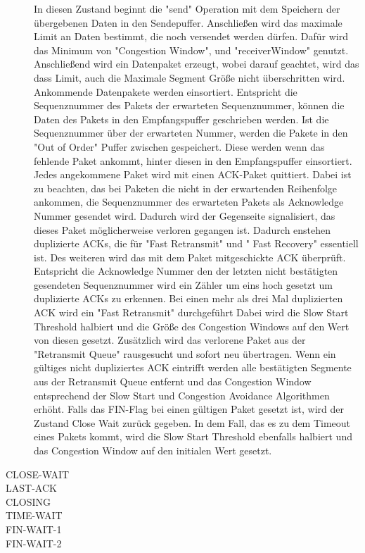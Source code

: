 \begin{description}
In diesen Zustand beginnt die {}"send"{} Operation mit dem Speichern der übergebenen Daten in den Sendepuffer. Anschließen wird das maximale Limit an Daten bestimmt, die noch versendet werden dürfen. Dafür wird das Minimum von "Congestion Window", und "receiverWindow"{} genutzt. Anschließend wird ein Datenpaket erzeugt, wobei darauf geachtet, wird das dass Limit, auch die Maximale Segment Größe nicht überschritten wird. \\
Ankommende Datenpakete werden einsortiert. Entspricht die Sequenznummer des Pakets der erwarteten Sequenznummer, können die Daten des Pakets in den Empfangspuffer geschrieben werden. Ist die Sequenznummer über der erwarteten Nummer, werden die Pakete in den "{}Out of Order"{}  Puffer zwischen gespeichert. Diese werden wenn das fehlende Paket ankommt, hinter diesen in den Empfangspuffer einsortiert. Jedes angekommene Paket wird mit einen ACK-Paket quittiert. Dabei ist zu beachten, das bei Paketen die nicht in der erwartenden Reihenfolge ankommen, die Sequenznummer des erwarteten Pakets als Acknowledge Nummer gesendet wird. Dadurch wird der Gegenseite signalisiert, das dieses Paket möglicherweise verloren gegangen ist. Dadurch enstehen duplizierte ACKs,  die für  "{}Fast Retransmit"{} und "{} Fast Recovery"{} essentiell ist.
Des weiteren wird das mit dem Paket mitgeschickte ACK überprüft. Entspricht die Acknowledge Nummer den der letzten nicht bestätigten gesendeten Sequenznummer wird ein Zähler um eins hoch gesetzt um duplizierte ACKs zu erkennen. Bei einen mehr als drei Mal duplizierten ACK wird ein {}"Fast Retransmit"{} durchgeführt Dabei wird die Slow Start Threshold halbiert und die Größe des Congestion Windows auf den Wert von diesen gesetzt. Zusätzlich wird das verlorene Paket aus der "{}Retransmit Queue"{} rausgesucht und sofort neu übertragen. Wenn ein gültiges nicht dupliziertes ACK eintrifft werden alle bestätigten Segmente aus der Retransmit Queue entfernt und das Congestion Window entsprechend der Slow Start und Congestion Avoidance Algorithmen erhöht. Falls das FIN-Flag bei einen gültigen Paket gesetzt ist, wird der Zustand Close Wait zurück gegeben.  
In dem Fall, das es zu dem Timeout eines Pakets kommt, wird die Slow Start Threshold ebenfalls halbiert und das Congestion Window auf den initialen Wert gesetzt. 

\item[CLOSE-WAIT]



\item[LAST-ACK]

\item[CLOSING]

\item[TIME-WAIT]

\item[FIN-WAIT-1]

\item[FIN-WAIT-2]	


\end{description}

